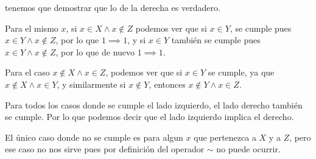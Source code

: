 \begin{enumerate}[a)]
\begin{enumerate}[1)]
        tenemos que demostrar que lo de la derecha es verdadero.
        
        Para el mismo $x$, si $x \in X \land x \notin Z$ podemos ver que si $x \in Y$, se cumple pues $x \in Y \land x \notin Z$, por lo que $1 \implies 1$, y si $x \in Y$ también se cumple pues $x \in Y \land x \notin Z$, por lo que de nuevo $1 \implies 1$.
        
        Para el caso $x \notin X \land x \in Z$, podemos ver que si $x \in Y$ se cumple, ya que $x \notin X \land x \in Y$, y similarmente si $x \notin Y$, entonces $x \notin Y \land x \in Z$.

        Para todos los casos donde se cumple el lado izquierdo, el lado derecho también se cumple. Por lo que podemos decir que el lado izquierdo implica el derecho. 
        
        El único caso donde no se cumple es para algun $x$ que pertenezca a $X$ y a $Z$, pero ese caso no nos sirve pues por definición del operador $\sim$ no puede ocurrir.
        
        \end{enumerate}
        
\end{enumerate}

